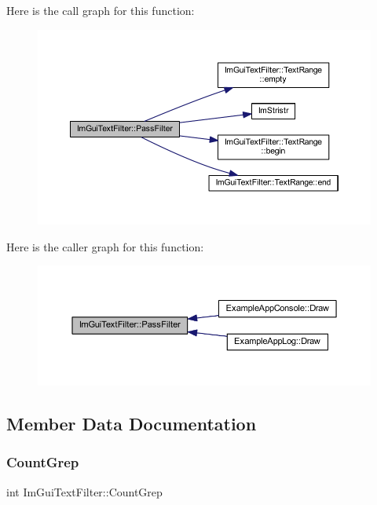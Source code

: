 Here is the call graph for this function\+:
\nopagebreak
\begin{figure}[H]
\begin{center}
\leavevmode
\includegraphics[width=350pt]{struct_im_gui_text_filter_a88d73ff8b81fbbd0a129b1bf3498d8aa_cgraph}
\end{center}
\end{figure}
Here is the caller graph for this function\+:
\nopagebreak
\begin{figure}[H]
\begin{center}
\leavevmode
\includegraphics[width=350pt]{struct_im_gui_text_filter_a88d73ff8b81fbbd0a129b1bf3498d8aa_icgraph}
\end{center}
\end{figure}


\subsection{Member Data Documentation}
\mbox{\label{struct_im_gui_text_filter_ac31839c319fe4211c21fc143b7249f86}} 
\subsubsection{\texorpdfstring{Count\+Grep}{CountGrep}}
{\footnotesize\ttfamily int Im\+Gui\+Text\+Filter\+::\+Count\+Grep}

